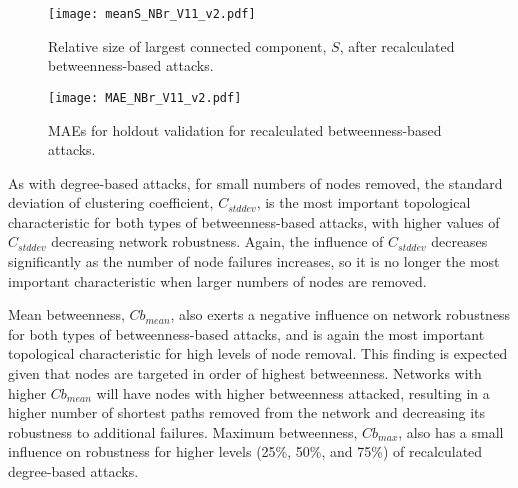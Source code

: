 

\begin{figure}[!htp]
\begin{center}
\texttt{[image: meanS\_NBr\_V11\_v2.pdf]}
\caption{\label{fig:ch2:meanSNBr}Relative size of largest connected component, $S$, after recalculated betweenness-based attacks.}
\end{center}
\end{figure}



\begin{figure}[!htp]
\begin{center}
\texttt{[image: MAE\_NBr\_V11\_v2.pdf]}
\caption{\label{fig:ch2:maeNBr}MAEs for holdout validation for recalculated betweenness-based attacks.}
\end{center}
\end{figure}


As with degree-based attacks, for small numbers of nodes removed, the standard deviation of clustering coefficient, $C_{std dev}$, is the most important topological characteristic for both types of betweenness-based attacks, with higher values of $C_{std dev}$ decreasing network robustness. Again, the influence of $C_{std dev}$ decreases significantly as the number of node failures increases, so it is no longer the most important characteristic when larger numbers of nodes are removed.

Mean betweenness, $Cb_{mean}$, also exerts a negative influence on network robustness for both types of betweenness-based attacks, and is again the most important topological characteristic for high levels of node removal. This finding is expected given that nodes are targeted in order of highest betweenness.  Networks with higher $Cb_{mean}$ will have nodes with higher betweenness attacked, resulting in a higher number of shortest paths removed from the network and decreasing its robustness to additional failures. Maximum betweenness, $Cb_{max}$, also has a small influence on robustness for higher levels (25\%, 50\%, and 75\%) of recalculated degree-based attacks.

